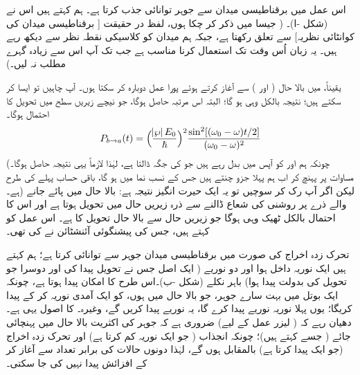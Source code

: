 اس عمل میں برقناطیسی میدان سے جوہر  توانائی جذب کرتا ہے۔ ہم کہتے ہیں اس نے  (شکل -ا)۔ ( جیسا میں ذکر کر چکا ہوں، لفظ  در حقیقت [ برقناطیسی میدان کی کوانٹائی نظریہ] سے تعلق رکھتا ہے، جبکہ ہم میدان کو کلاسیکی نقطہ نظر سے دیکھ رہے ہیں۔ یہ زبان اُس وقت تک استعمال کرنا مناسب ہے جب تک آپ اس سے زیادہ گہرے مطلب نہ لیں۔)

یقیناً، میں بالا حال (  اور ) سے آغاز کرتے ہوئے پورا عمل دوبارہ کر سکتا ہوں۔ آپ چاہیں تو ایسا کر سکتے ہیں؛ نتیجہ بالکل وہی ہو گا؛ البتہ اس
 مرتبہ  حاصل ہوگا، جو نیچے زیریں سطح میں تحویل کا احتمال ہوگا۔
\begin{align}\label{مساوات_تابع_مضطرب_تحویلی_احتمال_سعت}
	P_{b\to a} (t) = \Big(\frac{\abs{\wp}E_0}{\hslash}\Big)^2 \frac{\sin^2[(\omega_0 - \omega)t/2]}{(\omega_0 - \omega)^2}
\end{align}
(چونکہ ہم  اور  کو آپس میں بدل  رہے ہیں جو  کی جگہ  ڈالتا ہے، لہٰذا لازماً یہی نتیجہ حاصل ہوگا۔ مساوات  پر پہنچ کر اب ہم پہلا جزو چنتے ہیں جس کے نسب نما میں  ہو گا، باقی حساب پہلے کی طرح ہے۔) لیکن اگر آپ رک کر سوچیں تو یہ ایک حیرت انگیز نتیجہ ہے: بالا حال میں پائے جانے والے ذرے پر روشنی کی شعاع ڈالنے سے ذرہ زیریں حال میں تحویل ہوتا ہے اور اس کا احتمال بالکل ٹھیک وہی ہوگا جو زیریں حال سے بالا حال تحویل کا ہے۔ اس عمل کو  کہتے ہیں، جس کی پیشنگوئی آئنشٹائن نے کی تھی۔

تحرک زدہ اخراج کی صورت میں برقناطیسی میدان جوہر سے  توانائی کرتا ہے؛ ہم کہتے ہیں ایک نوریہ داخل ہوا اور دو نوریے ( ایک اصل جس نے تحویل پیدا کی اور دوسرا جو تحویل کی بدولت پیدا ہوا) باہر نکلے (شکل -ب)۔اس طرح  کا امکان پیدا ہوتا ہے، چونکہ ایک بوتل میں بہت سارے جوہر، جو بالا حال میں ہوں، کو ایک آمدی نوریہ  کر کے  پیدا کریگا؛ یوں پہلا نوریہ  نوریے پیدا کرے گا، یہ نوریے  پیدا کریں گے، وغیرہ۔ کا اصول یہی ہے۔ دھیان رہے کہ ( لیزر عمل کے لیے) ضروری ہے کہ جوہر کی اکثریت بالا حال میں پہنچائی جائے ( جسے  کہتے ہیں)؛ چونکہ انجذاب ( جو ایک نوریہ کم کرتا ہے) اور تحرک زدہ اخراج (جو ایک پیدا کرتا ہے) بالمقابل ہوں گے، لہٰذا دونوں حالات کی برابر تعداد سے آغاز کر کے افزائش پیدا نہیں کی جا سکتی۔ 

